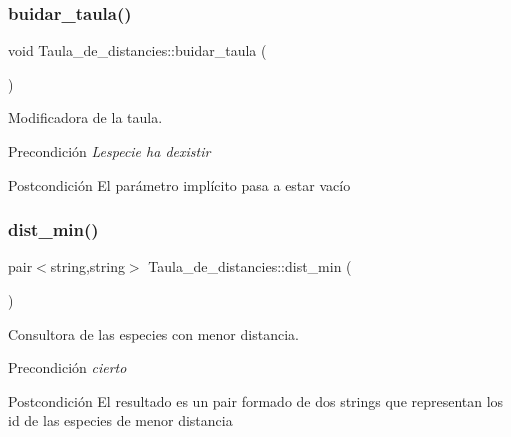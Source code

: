 \subsubsection{\texorpdfstring{buidar\+\_\+taula()}{buidar\_taula()}}
{\footnotesize\ttfamily void Taula\+\_\+de\+\_\+distancies\+::buidar\+\_\+taula (\begin{DoxyParamCaption}{ }\end{DoxyParamCaption})}



Modificadora de la taula. 

\begin{DoxyPrecond}{Precondición}
{\itshape L\textquotesingle{}especie ha d\textquotesingle{}existir} 
\end{DoxyPrecond}
\begin{DoxyPostcond}{Postcondición}
El parámetro implícito pasa a estar vacío 
\end{DoxyPostcond}
\mbox{\label{class_taula__de__distancies_a416612e603b4efafa816db9da4164b0b}} 
\subsubsection{\texorpdfstring{dist\+\_\+min()}{dist\_min()}}
{\footnotesize\ttfamily pair$<$string,string$>$ Taula\+\_\+de\+\_\+distancies\+::dist\+\_\+min (\begin{DoxyParamCaption}{ }\end{DoxyParamCaption})}



Consultora de las especies con menor distancia. 

\begin{DoxyPrecond}{Precondición}
{\itshape cierto} 
\end{DoxyPrecond}
\begin{DoxyPostcond}{Postcondición}
El resultado es un pair formado de dos strings que representan los id de las especies de menor distancia 
\end{DoxyPostcond}
\mbox{\label{class_taula__de__distancies_ae2fadcfa91e0c11028b0cec49ba77a0f}} 
